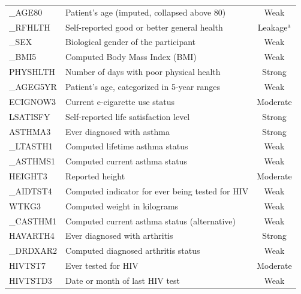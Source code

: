 \documentclass[conference]{IEEEtran}
\begin{document}
\begin{table}[htbp]
\begin{center}
\begin{tabular}{|l|p{4.5cm}|c|}
\_AGE80 & Patient's age (imputed, collapsed above 80) & Weak \\

\_RFHLTH & Self-reported good or better general health & Leakage$^{\mathrm{a}}$ \\

\_SEX & Biological gender of the participant & Weak \\

\_BMI5 & Computed Body Mass Index (BMI) & Weak \\

PHYSHLTH & Number of days with poor physical health & Strong \\

\_AGEG5YR & Patient's age, categorized in 5-year ranges & Weak \\

ECIGNOW3 & Current e-cigarette use status & Moderate \\

LSATISFY & Self-reported life satisfaction level & Strong \\

ASTHMA3 & Ever diagnosed with asthma & Strong \\

\_LTASTH1 & Computed lifetime asthma status & Weak \\

\_ASTHMS1 & Computed current asthma status & Weak \\

HEIGHT3 & Reported height & Moderate \\

\_AIDTST4 & Computed indicator for ever being tested for HIV & Weak \\

WTKG3 & Computed weight in kilograms & Weak \\

\_CASTHM1 & Computed current asthma status (alternative) & Weak \\

HAVARTH4 & Ever diagnosed with arthritis & Strong \\

\_DRDXAR2 & Computed diagnosed arthritis status & Weak \\

HIVTST7 & Ever tested for HIV & Moderate \\

HIVTSTD3 & Date or month of last HIV test & Weak \\


\end{tabular}
\end{center}
\end{table}
\end{document}
